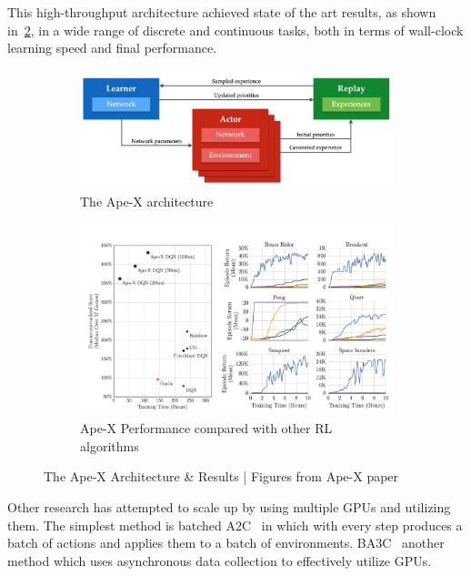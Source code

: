 This high-throughput architecture achieved state of the art results, as shown in~\ref{fig:apex_results}, in a wide range of discrete and continuous tasks, both in terms of wall-clock learning speed and final performance.

\begin{figure}[!htb]
	\centering
	\begin{subfigure}[b]{0.5\textwidth}
		\centering
		\includegraphics[width=\textwidth]{figures/algos/apex.png}
		\caption{The Ape-X architecture}
		\label{fig:apex_arch}
	\end{subfigure}
	\begin{subfigure}[b]{0.5\textwidth}
		\centering
		\includegraphics[width=\textwidth]{figures/algos/apex_results.png}
		\caption{Ape-X Performance compared with other RL algorithms}
		\label{fig:apex_results}
	\end{subfigure}
	\hfill
	\caption{The Ape-X Architecture \& Results | Figures from Ape-X paper~\parencite{horgan2018distributed}}
	\label{fig:apex}
\end{figure}

Other research has attempted to scale up by using multiple GPUs and utilizing them. The simplest method is batched A2C~\parencite{clemente2017efficient} in which with every step produces a batch of actions and applies them to a batch of environments. BA3C~\parencite{babaeizadeh2016ga3c} another method which uses asynchronous data collection to effectively utilize GPUs.

